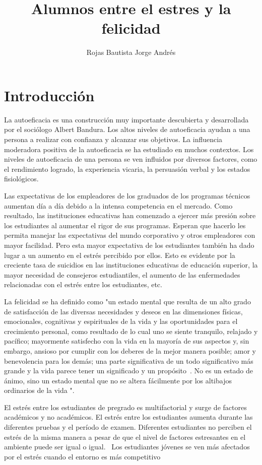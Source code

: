 \documentclass[jou,apacite]{apa6}
\title{Alumnos entre el estres y la felicidad}
\author{Rojas Bautista Jorge Andrés}
\affiliation{Universidad Distrital Francisco Jose de Caldas}
\begin{document}
\maketitle    
                        
\section{Introducción}
La autoeficacia es una construcción muy importante descubierta y desarrollada por el sociólogo Albert Bandura. Los altos niveles de autoeficacia ayudan a una persona a realizar con confianza y alcanzar sus objetivos. La influencia moderadora positiva de la autoeficacia se ha estudiado en muchos contextos. Los niveles de autoeficacia de una persona se ven influidos por diversos factores, como el rendimiento logrado, la experiencia vicaria, la persuasión verbal y los estados fisiológicos.~\cite{Andura}

Las expectativas de los empleadores de los graduados de los programas técnicos aumentan día a día debido a la intensa competencia en el mercado. Como resultado, las instituciones educativas han comenzado a ejercer más presión sobre los estudiantes al aumentar el rigor de sus programas. Esperan que hacerlo les permita manejar las expectativas del mundo corporativo y otros empleadores con mayor facilidad. Pero esta mayor expectativa de los estudiantes también ha dado lugar a un aumento en el estrés percibido por ellos. Esto es evidente por la creciente tasa de suicidios en las instituciones educativas de educación superior, la mayor necesidad de consejeros estudiantiles, el aumento de las enfermedades relacionadas con el estrés entre los estudiantes, etc.

La felicidad se ha definido como "un estado mental que resulta de un alto grado de satisfacción de las diversas necesidades y deseos en las dimensiones físicas, emocionales, cognitivas y espirituales de la vida y las oportunidades para el crecimiento personal, como resultado de lo cual uno se siente tranquilo, relajado y pacífico; mayormente satisfecho con la vida en la mayoría de sus aspectos y, sin embargo, ansioso por cumplir con los deberes de la mejor manera posible; amor y benevolencia para los demás; una parte significativa de un todo significativo más grande y la vida parece tener un significado y un propósito~\cite{chen}. No es un estado de ánimo, sino un estado mental que no se altera fácilmente por los altibajos ordinarios de la vida ".~\cite{Prasad}

El estrés entre los estudiantes de pregrado es multifactorial y surge de factores académicos y no académicos. El estrés entre los estudiantes aumenta durante las diferentes pruebas y el período de examen. Diferentes estudiantes no perciben el estrés de la misma manera a pesar de que el nivel de factores estresantes en el ambiente puede ser igual o igual.~\cite{Brand} Los estudiantes jóvenes se ven más afectados por el estrés cuando el entorno es más competitivo
\end{document}
